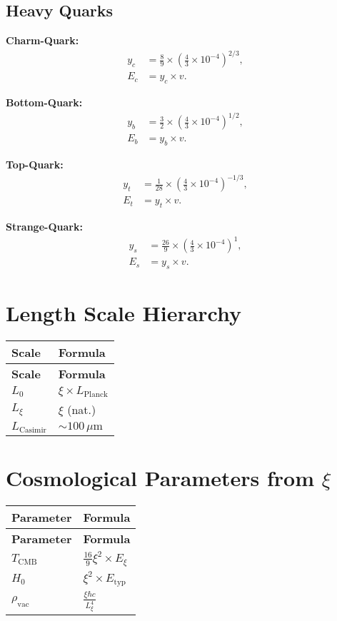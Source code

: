 \documentclass[12pt,a4paper]{article}
\begin{document}
	\subsection{Heavy Quarks}
	
	\textbf{Charm-Quark:}
	\begin{align}
		y_c &= \frac{8}{9} \times \left(\frac{4}{3} \times 10^{-4}\right)^{2/3}, \\
		E_c &= y_c \times v.
	\end{align}
	
	\textbf{Bottom-Quark:}
	\begin{align}
		y_b &= \frac{3}{2} \times \left(\frac{4}{3} \times 10^{-4}\right)^{1/2}, \\
		E_b &= y_b \times v.
	\end{align}
	
	\textbf{Top-Quark:}
	\begin{align}
		y_t &= \frac{1}{28} \times \left(\frac{4}{3} \times 10^{-4}\right)^{-1/3}, \\
		E_t &= y_t \times v.
	\end{align}
	
	\textbf{Strange-Quark:}
	\begin{align}
		y_s &= \frac{26}{9} \times \left(\frac{4}{3} \times 10^{-4}\right)^{1}, \\
		E_s &= y_s \times v.
	\end{align}
	
	\section{Length Scale Hierarchy}
	\begin{longtable}{|p{5cm}|p{6cm}|}
		\hline
		\textbf{Scale} & \textbf{Formula} \\
		\hline
		\endfirsthead
		\hline
		\textbf{Scale} & \textbf{Formula} \\
		\hline
		\endhead
		$L_0$ & $\xi \times L_{\text{Planck}}$ \\
		\hline
		$L_{\xi}$ & $\xi$ (nat.) \\
		\hline
		$L_{\text{Casimir}}$ & $\sim 100 \, \mu\text{m}$ \\
		\hline
	\end{longtable}
	
	\section{Cosmological Parameters from $\xi$}
	\begin{longtable}{|p{5cm}|p{6cm}|}
		\hline
		\textbf{Parameter} & \textbf{Formula} \\
		\hline
		\endfirsthead
		\hline
		\textbf{Parameter} & \textbf{Formula} \\
		\hline
		\endhead
		$T_{\text{CMB}}$ & $\frac{16}{9}\xi^{2} \times E_{\xi}$ \\
		\hline
		$H_0$ & $\xi^{2} \times E_{\text{typ}}$ \\
		\hline
		$\rho_{\text{vac}}$ & $\frac{\xi\hbar c}{L_{\xi}^{4}}$ \\
		\hline
	\end{longtable}
	
\end{document}
